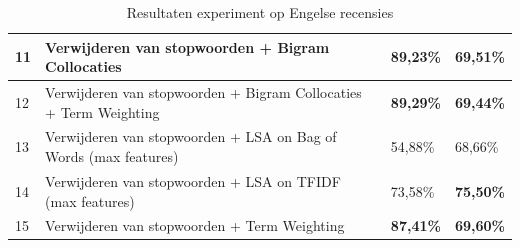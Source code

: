 \begin{table}[h]
\begin{adjustbox}{width=1\textwidth}
\begin{tabular}{|l|l|l|l|}
11       & Verwijderen van stopwoorden + Bigram Collocaties                                    & {\bf 89,23\%}                           & {\bf 69,51\%}                  \\ \hline
12       & Verwijderen van stopwoorden + Bigram Collocaties + Term Weighting                   & {\bf 89,29\%}                           & {\bf 69,44\%}                  \\ \hline
13       & Verwijderen van stopwoorden + LSA on Bag of Words (max features)                    & 54,88\%                                 & 68,66\%                        \\ \hline
14       & Verwijderen van stopwoorden + LSA on TFIDF (max features)                           & 73,58\%                                 & {\bf 75,50\%}                  \\ \hline
15       & Verwijderen van stopwoorden + Term Weighting                                        & {\bf 87,41\%}                           & {\bf 69,60\%}                  \\ \hline
\end{tabular}
\end{adjustbox}

\caption{Resultaten experiment op Engelse recensies}
\label{tabel: resultaten engelse gevoelsanalyse}
\end{table}


